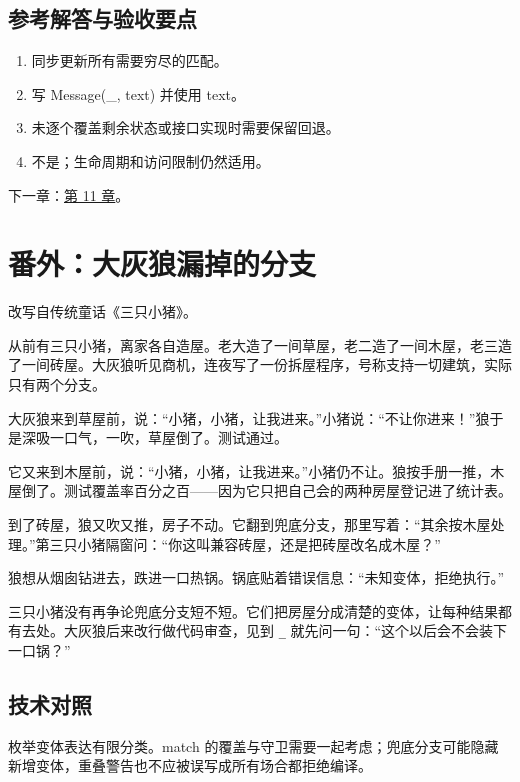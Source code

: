 \subsection*{参考解答与验收要点}

\begin{enumerate}

\item 同步更新所有需要穷尽的匹配。

\item 写 Message(\_, text) 并使用 text。

\item 未逐个覆盖剩余状态或接口实现时需要保留回退。

\item 不是；生命周期和访问限制仍然适用。

\end{enumerate}

下一章：\hyperref[ch:11]{第 11 章}。

\section{番外：大灰狼漏掉的分支}

改写自传统童话《三只小猪》。

从前有三只小猪，离家各自造屋。老大造了一间草屋，老二造了一间木屋，老三造了一间砖屋。大灰狼听见商机，连夜写了一份拆屋程序，号称支持一切建筑，实际只有两个分支。

大灰狼来到草屋前，说：“小猪，小猪，让我进来。”小猪说：“不让你进来！”狼于是深吸一口气，一吹，草屋倒了。测试通过。

它又来到木屋前，说：“小猪，小猪，让我进来。”小猪仍不让。狼按手册一推，木屋倒了。测试覆盖率百分之百——因为它只把自己会的两种房屋登记进了统计表。

到了砖屋，狼又吹又推，房子不动。它翻到兜底分支，那里写着：“其余按木屋处理。”第三只小猪隔窗问：“你这叫兼容砖屋，还是把砖屋改名成木屋？”

狼想从烟囱钻进去，跌进一口热锅。锅底贴着错误信息：“未知变体，拒绝执行。”

三只小猪没有再争论兜底分支短不短。它们把房屋分成清楚的变体，让每种结果都有去处。大灰狼后来改行做代码审查，见到 \texttt{\_\allowbreak{}} 就先问一句：“这个以后会不会装下一口锅？”

\subsection*{技术对照}

枚举变体表达有限分类。match 的覆盖与守卫需要一起考虑；兜底分支可能隐藏新增变体，重叠警告也不应被误写成所有场合都拒绝编译。
